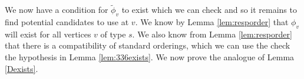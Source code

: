 \documentclass[class=book, crop=false]{standalone}
\begin{document}
%
%
%
We now have a condition for $\tilde{\phi}_v$ to exist which we can check and so it remains to find potential candidates to use at $v.$ We know by Lemma \ref{lem:resporder} that $\phi_{v}$ will exist for all vertices $v$ of type $s.$ We also know from Lemma \ref{lem:resporder} that there is a compatibility of standard orderings, which we can use the check the hypothesis in Lemma \ref{lem:336exists}. We now prove the analogue of Lemma \ref{Dexists}.
\end{document}
